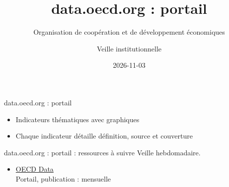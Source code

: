 \documentclass[aspectratio=169,11pt]{beamer}
\title{data.oecd.org : portail}
\subtitle{Organisation de coopération et de développement économiques}
\author{Veille institutionnelle}
\date{2026-11-03}
\begin{document}
\begin{frame}\titlepage\end{frame}

\begin{frame}{data.oecd.org : portail}
\begin{itemize}
\item Indicateurs thématiques avec graphiques
\item Chaque indicateur détaille définition, source et couverture
\end{itemize}
\end{frame}

\begin{frame}{data.oecd.org : portail : ressources à suivre}
\small
Veille hebdomadaire.
\begin{itemize}
\item \href{https://data.oecd.org}{OECD Data}\\{\footnotesize Portail, publication : mensuelle}
\end{itemize}
\end{frame}
\end{document}
